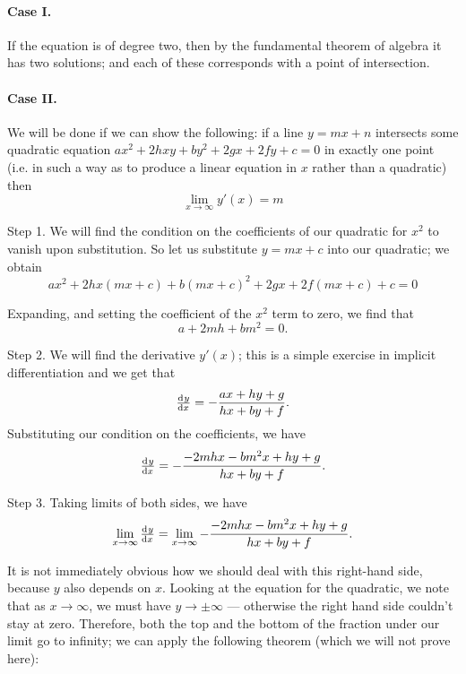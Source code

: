 \documentclass[a4paper,leqno]{article}
\numberwithin{equation}{section}
\theoremstyle{definition}
\theoremstyle{remark}
\begin{document}
\paragraph{Case I.} If the equation is of degree two, then by the fundamental theorem of algebra it
has two solutions; and each of these corresponds with a point of intersection.

\paragraph{Case II.} We will be done if we can show the following: if a line $ y = mx + n $ intersects
some quadratic equation $ ax^2 + 2hxy + by^2 + 2gx + 2fy + c = 0 $ in exactly one point (i.e. in such a
way as to produce a linear equation in $ x $ rather than a quadratic) then
\begin{equation}
  \lim_{x \to \infty} y'(x) = m
\end{equation}

Step 1. We will find the condition on the coefficients of our quadratic for $ x^2 $ to vanish upon substitution.
So let us substitute $ y = mx + c $ into our quadratic; we obtain
\begin{displaymath}
  ax^2 + 2hx(mx + c) + b(mx + c)^2 + 2gx + 2f(mx + c) + c = 0
\end{displaymath}

Expanding, and setting the coefficient of the $ x^2 $ term to zero, we find that
\begin{displaymath}
  a + 2mh + bm^2 = 0.
\end{displaymath}

Step 2. We will find the derivative $ y'(x) $; this is a simple exercise in implicit differentiation and we get that
\begin{displaymath}
  \od{y}{x} = -\frac{ax + hy + g}{hx + by + f}.
\end{displaymath}
Substituting our condition on the coefficients, we have
\begin{displaymath}
  \od{y}{x} = -\frac{-2mhx - bm^2x + hy + g}{hx + by + f}.
\end{displaymath}

Step 3. Taking limits of both sides, we have
\begin{displaymath}
  \lim_{x \to \infty} \od{y}{x} = \lim_{x \to \infty} -\frac{-2mhx - bm^2x + hy + g}{hx + by + f}.
\end{displaymath}

It is not immediately obvious how we should deal with this right-hand side, because $ y $ also depends
on $ x $. Looking at the equation for the quadratic, we note that as $ x \to \infty $, we must have $ y \to \pm\infty $ ---
otherwise the right hand side couldn't stay at zero. Therefore, both the top and the bottom of the fraction under our
limit go to infinity; we can apply the following theorem (which we will not prove here):
\end{document}
